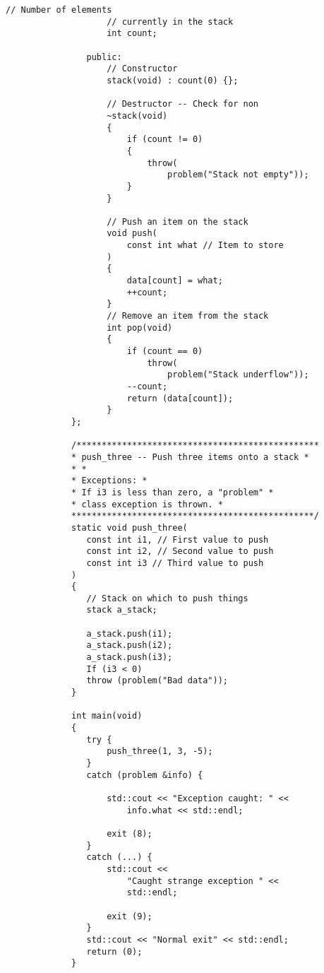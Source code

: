 \begin{LTR}
\begin{lstlisting}[style=C++Style]
             		// Number of elements
             		// currently in the stack
             		int count;

             	public:
             		// Constructor
             		stack(void) : count(0) {};

             		// Destructor -- Check for non
             		~stack(void)
             		{
             			if (count != 0)
             			{
             				throw(
             					problem("Stack not empty"));
             			}
             		}

             		// Push an item on the stack
             		void push(
             			const int what // Item to store
             		)
             		{
             			data[count] = what;
             			++count;
             		}
             		// Remove an item from the stack
             		int pop(void)
             		{
             			if (count == 0)
             				throw(
             					problem("Stack underflow"));
             			--count;
             			return (data[count]);
             		}
             };

             /************************************************
             * push_three -- Push three items onto a stack *
             * *
             * Exceptions: *
             * If i3 is less than zero, a "problem" *
             * class exception is thrown. *
             ************************************************/
             static void push_three(
             	const int i1, // First value to push
             	const int i2, // Second value to push
             	const int i3 // Third value to push
             )
             {
             	// Stack on which to push things
             	stack a_stack;

             	a_stack.push(i1);
             	a_stack.push(i2);
             	a_stack.push(i3);
             	If (i3 < 0)
             	throw (problem("Bad data"));
             }

             int main(void)
             {
             	try {
             		push_three(1, 3, -5);
             	}
             	catch (problem &info) {

             		std::cout << "Exception caught: " <<
             			info.what << std::endl;

             		exit (8);
             	}
             	catch (...) {
             		std::cout <<
             			"Caught strange exception " <<
             			std::endl;

             		exit (9);
             	}
             	std::cout << "Normal exit" << std::endl;
             	return (0);
             }
        \end{lstlisting}
\end{LTR}